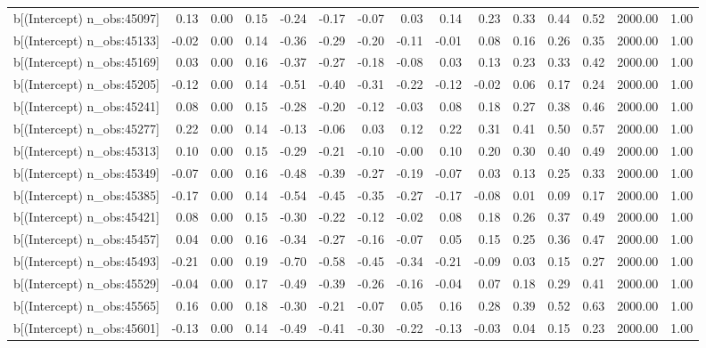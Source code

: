 \begin{table}[ht]
\begin{tabular}{rrrrrrrrrrrrrrr}
  b[(Intercept) n\_obs:45097] & 0.13 & 0.00 & 0.15 & -0.24 & -0.17 & -0.07 & 0.03 & 0.14 & 0.23 & 0.33 & 0.44 & 0.52 & 2000.00 & 1.00 \\ 
  b[(Intercept) n\_obs:45133] & -0.02 & 0.00 & 0.14 & -0.36 & -0.29 & -0.20 & -0.11 & -0.01 & 0.08 & 0.16 & 0.26 & 0.35 & 2000.00 & 1.00 \\ 
  b[(Intercept) n\_obs:45169] & 0.03 & 0.00 & 0.16 & -0.37 & -0.27 & -0.18 & -0.08 & 0.03 & 0.13 & 0.23 & 0.33 & 0.42 & 2000.00 & 1.00 \\ 
  b[(Intercept) n\_obs:45205] & -0.12 & 0.00 & 0.14 & -0.51 & -0.40 & -0.31 & -0.22 & -0.12 & -0.02 & 0.06 & 0.17 & 0.24 & 2000.00 & 1.00 \\ 
  b[(Intercept) n\_obs:45241] & 0.08 & 0.00 & 0.15 & -0.28 & -0.20 & -0.12 & -0.03 & 0.08 & 0.18 & 0.27 & 0.38 & 0.46 & 2000.00 & 1.00 \\ 
  b[(Intercept) n\_obs:45277] & 0.22 & 0.00 & 0.14 & -0.13 & -0.06 & 0.03 & 0.12 & 0.22 & 0.31 & 0.41 & 0.50 & 0.57 & 2000.00 & 1.00 \\ 
  b[(Intercept) n\_obs:45313] & 0.10 & 0.00 & 0.15 & -0.29 & -0.21 & -0.10 & -0.00 & 0.10 & 0.20 & 0.30 & 0.40 & 0.49 & 2000.00 & 1.00 \\ 
  b[(Intercept) n\_obs:45349] & -0.07 & 0.00 & 0.16 & -0.48 & -0.39 & -0.27 & -0.19 & -0.07 & 0.03 & 0.13 & 0.25 & 0.33 & 2000.00 & 1.00 \\ 
  b[(Intercept) n\_obs:45385] & -0.17 & 0.00 & 0.14 & -0.54 & -0.45 & -0.35 & -0.27 & -0.17 & -0.08 & 0.01 & 0.09 & 0.17 & 2000.00 & 1.00 \\ 
  b[(Intercept) n\_obs:45421] & 0.08 & 0.00 & 0.15 & -0.30 & -0.22 & -0.12 & -0.02 & 0.08 & 0.18 & 0.26 & 0.37 & 0.49 & 2000.00 & 1.00 \\ 
  b[(Intercept) n\_obs:45457] & 0.04 & 0.00 & 0.16 & -0.34 & -0.27 & -0.16 & -0.07 & 0.05 & 0.15 & 0.25 & 0.36 & 0.47 & 2000.00 & 1.00 \\ 
  b[(Intercept) n\_obs:45493] & -0.21 & 0.00 & 0.19 & -0.70 & -0.58 & -0.45 & -0.34 & -0.21 & -0.09 & 0.03 & 0.15 & 0.27 & 2000.00 & 1.00 \\ 
  b[(Intercept) n\_obs:45529] & -0.04 & 0.00 & 0.17 & -0.49 & -0.39 & -0.26 & -0.16 & -0.04 & 0.07 & 0.18 & 0.29 & 0.41 & 2000.00 & 1.00 \\ 
  b[(Intercept) n\_obs:45565] & 0.16 & 0.00 & 0.18 & -0.30 & -0.21 & -0.07 & 0.05 & 0.16 & 0.28 & 0.39 & 0.52 & 0.63 & 2000.00 & 1.00 \\ 
  b[(Intercept) n\_obs:45601] & -0.13 & 0.00 & 0.14 & -0.49 & -0.41 & -0.30 & -0.22 & -0.13 & -0.03 & 0.04 & 0.15 & 0.23 & 2000.00 & 1.00 \\ 

\end{tabular}
\end{table}
